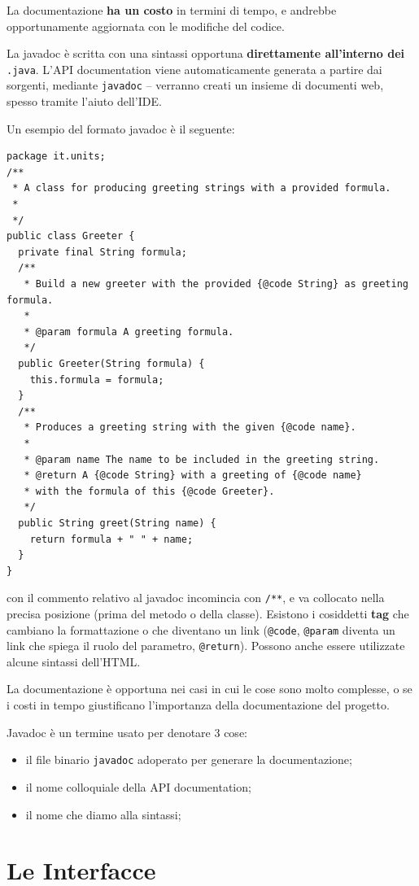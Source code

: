 \documentclass[\fontsizeclass,twocolumn]{\classname}
\theoremstyle{definition}
\theoremstyle{definition}
\begin{document}
La documentazione \textbf{ha un costo} in termini di tempo, e andrebbe
opportunamente aggiornata con le modifiche del codice.

La javadoc è scritta con una sintassi opportuna \textbf{direttamente
all'interno dei } \texttt{.java}. L'API documentation viene automaticamente
generata a partire dai sorgenti, mediante \texttt{javadoc} -- verranno creati
un insieme di documenti web, spesso tramite l'aiuto dell'IDE.

Un esempio del formato javadoc è il seguente:

\begin{lstlisting}
package it.units;
/**
 * A class for producing greeting strings with a provided formula.
 *
 */
public class Greeter {
  private final String formula;
  /**
   * Build a new greeter with the provided {@code String} as greeting formula.
   *
   * @param formula A greeting formula.
   */
  public Greeter(String formula) {
    this.formula = formula;
  }
  /**
   * Produces a greeting string with the given {@code name}.
   *
   * @param name The name to be included in the greeting string.
   * @return A {@code String} with a greeting of {@code name}
   * with the formula of this {@code Greeter}.
   */
  public String greet(String name) {
    return formula + " " + name;
  }
}
\end{lstlisting}

con il commento relativo al javadoc incomincia con \texttt{/**}, e va collocato
nella precisa posizione (prima del metodo o della classe). Esistono i
cosiddetti \textbf{tag} che cambiano la formattazione o che diventano un link
(\texttt{@code}, \texttt{@param} diventa un link che spiega il ruolo del
parametro, \texttt{@return}). Possono anche essere utilizzate alcune sintassi
dell'HTML.

La documentazione è opportuna nei casi in cui le cose sono molto complesse, o
se i costi in tempo giustificano l'importanza della documentazione del
progetto.

Javadoc è un termine usato per denotare 3 cose:
\begin{itemize}
    \item il file binario \texttt{javadoc} adoperato per generare la
        documentazione;
    \item il nome colloquiale della API documentation;
    \item il nome che diamo alla sintassi;
\end{itemize}

\chapter{Le Interfacce}
\end{document}
